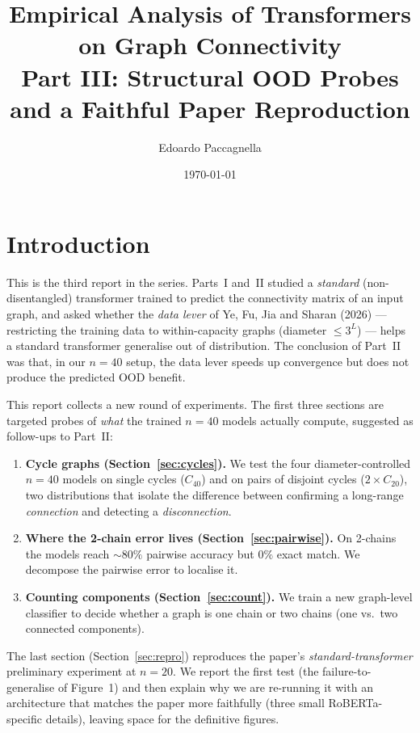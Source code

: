 \documentclass[11pt,a4paper]{article}
\title{Empirical Analysis of Transformers on Graph Connectivity \\
       \large Part III: Structural OOD Probes and a Faithful Paper Reproduction}
\author{Edoardo Paccagnella}
\date{\today}
\begin{document}
\maketitle

\section{Introduction}
\label{sec:intro}

This is the third report in the series. Parts~I and~II studied a
\emph{standard} (non-disentangled) transformer trained to predict the
connectivity matrix of an input graph, and asked whether the \emph{data
lever} of Ye, Fu, Jia and Sharan (2026) --- restricting the training data to
within-capacity graphs (diameter $\le 3^L$) --- helps a standard transformer
generalise out of distribution. The conclusion of Part~II was that, in our
$n = 40$ setup, the data lever speeds up convergence but does not produce the
predicted OOD benefit.

This report collects a new round of experiments. The first three sections are
targeted probes of \emph{what} the trained $n = 40$ models actually compute,
suggested as follow-ups to Part~II:
\begin{enumerate}
    \item \textbf{Cycle graphs (Section~\ref{sec:cycles}).} We test the four
          diameter-controlled $n = 40$ models on single cycles ($C_{40}$) and
          on pairs of disjoint cycles ($2 \times C_{20}$), two distributions
          that isolate the difference between confirming a long-range
          \emph{connection} and detecting a \emph{disconnection}.
    \item \textbf{Where the 2-chain error lives (Section~\ref{sec:pairwise}).}
          On 2-chains the models reach $\sim 80\%$ pairwise accuracy but
          $0\%$ exact match. We decompose the pairwise error to localise it.
    \item \textbf{Counting components (Section~\ref{sec:count}).} We train a
          new graph-level classifier to decide whether a graph is one chain
          or two chains (one vs.\ two connected components).
\end{enumerate}
The last section (Section~\ref{sec:repro}) reproduces the paper's
\emph{standard-transformer} preliminary experiment at $n = 20$. We report the
first test (the failure-to-generalise of Figure~1) and then explain why we are
re-running it with an architecture that matches the paper more faithfully
(three small RoBERTa-specific details), leaving space for the definitive
figures.
\end{document}

